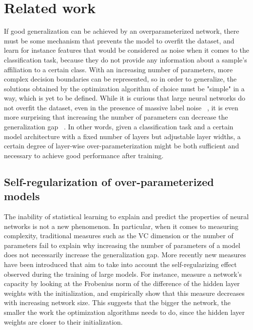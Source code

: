 \section{Related work}
\label{section:prior}
If good generalization can be achieved by an overparameterized network, there must be some mechanism that prevents the model to overfit the dataset, and learn for instance features that would be considered as noise when it comes to the classification task, because they do not provide any information about a sample's affiliation to a certain class. With an increasing number of parameters, more complex decision boundaries can be represented, so in order to generalize, the solutions obtained by the optimization algorithm of choice must be "simple" in a way, which is yet to be defined. While it is curious that large neural networks do not overfit the dataset, even in the presence of massive label noise ~\autocite{rolnick2017deep}, it is even more surprising that increasing the number of parameters can decrease the generalization gap ~\autocite{neyshabur2018towards}. In other words, given a classification task and a certain model architecture with a fixed number of layers but adjustable layer widths, a certain degree of layer-wise over-parameterization might be both sufficient and necessary to achieve good performance after training. 

\subsection{Self-regularization of over-parameterized models}
The inability of statistical learning to explain and predict the properties of neural networks is not a new phenomenon. In particular, when it comes to measuring complexity, traditional measures such as the VC dimension or the number of parameters fail to explain why increasing the number of parameters of a model does not necessarily increase the generalization gap. More recently new measures have been introduced that aim to take into account the self-regularizing effect observed during the training of large models. For instance, \cite{neyshabur2018towards} 
 measure a network's capacity by looking at the Frobenius norm of the difference of the hidden layer weights with the initialization, and empirically show that this measure decreases with increasing network size. This suggests that the bigger the network, the smaller the work the optimization algorithms needs to do, since the hidden layer weights are closer to their initialization. \\

